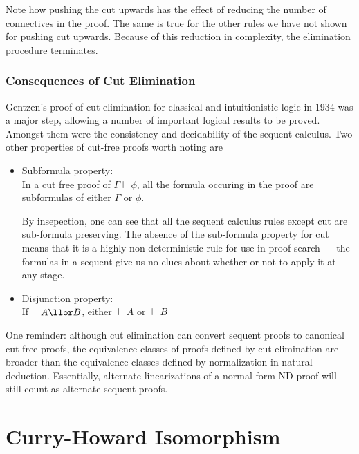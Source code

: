 Note how pushing the cut upwards has the effect of reducing the number of
connectives in the proof.  The same is true for the other rules
we have not shown for pushing cut upwards.  Because of this
reduction in complexity, the elimination procedure terminates.

\subsubsection{Consequences of Cut Elimination}

Gentzen's proof of cut elimination for classical and intuitionistic logic
in 1934 was a major step, allowing a number of important logical results
to be proved.  Amongst them were the consistency and decidability of
the sequent calculus.  Two other properties of cut-free proofs worth noting
are
\begin{itemize}
\item Subformula property:\\
In a cut free proof of $\Gamma\vdash \phi$, all the formula occuring in the
proof are subformulas of either $\Gamma$ or $\phi$.

By insepection, one can see that all the sequent calculus rules except
cut are sub-formula preserving.  The absence of the sub-formula property
for cut means that it is a highly non-deterministic rule for use in
proof search --- the formulas in a sequent give us no clues about whether
or not to apply it at any stage.

\item Disjunction property:\\
If $\vdash A\llor B$, either $\vdash A$ or $\vdash B$
\end{itemize}

One reminder: although cut elimination can convert sequent proofs to
canonical cut-free proofs, the equivalence classes of proofs defined
by cut elimination are broader than the equivalence classes defined
by normalization in natural deduction.  Essentially, alternate
linearizations of a normal form ND proof will still count as alternate
sequent proofs.



\section{Curry-Howard Isomorphism}

